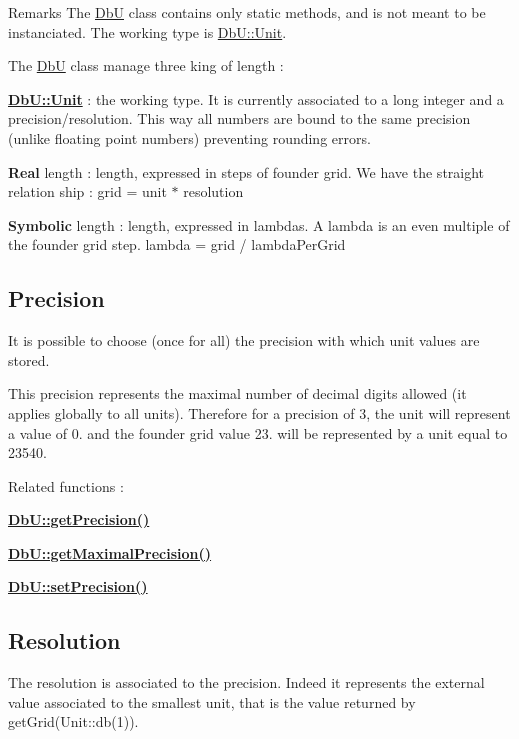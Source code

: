 \begin{DoxyRemark}{Remarks}
The \mbox{\hyperlink{classHurricane_1_1DbU}{DbU}} class contains only static methods, and is not meant to be instanciated. The working type is \mbox{\hyperlink{group__DbUGroup_ga4fbfa3e8c89347af76c9628ea06c4146}{Db\+U\+::\+Unit}}.
\end{DoxyRemark}
The \mbox{\hyperlink{classHurricane_1_1DbU}{DbU}} class manage three king of length \+: 
\begin{DoxyItemize}
\item {\bfseries \mbox{\hyperlink{group__DbUGroup_ga4fbfa3e8c89347af76c9628ea06c4146}{Db\+U\+::\+Unit}}} \+: the working type. It is currently associated to a long integer and a precision/resolution. This way all numbers are bound to the same precision (unlike floating point numbers) preventing rounding errors. 
\item {\bfseries Real} length \+: length, expressed in steps of founder grid. We have the straight relation ship \+: grid = unit $\ast$ resolution 
\item {\bfseries Symbolic} length \+: length, expressed in lambdas. A lambda is an even multiple of the founder grid step. lambda = grid / lambda\+Per\+Grid 
\end{DoxyItemize}\hypertarget{group__DbUGroup_secDbUPrecision}{}\subsection{Precision}\label{group__DbUGroup_secDbUPrecision}
It is possible to choose (once for all) the precision with which unit values are stored.

This precision represents the maximal number of decimal digits allowed (it applies globally to all units). Therefore for a precision of 3, the unit will represent a value of 0. and the founder grid value 23. will be represented by a unit equal to 23540.

Related functions \+: 
\begin{DoxyItemize}
\item {\bfseries \mbox{\hyperlink{group__DbUGroup_ga6169efbdd9b3d54a0bd8467c8f957fda}{Db\+U\+::get\+Precision()}}} 
\item {\bfseries \mbox{\hyperlink{group__DbUGroup_ga8756c9f0a32af5f601cd150e73b02c03}{Db\+U\+::get\+Maximal\+Precision()}}} 
\item {\bfseries \mbox{\hyperlink{group__DbUGroup_gace9a8644e7e80dcaed2a8a95deeb1622}{Db\+U\+::set\+Precision()}}} 
\end{DoxyItemize}\hypertarget{group__DbUGroup_secDbUResolution}{}\subsection{Resolution}\label{group__DbUGroup_secDbUResolution}
The resolution is associated to the precision. Indeed it represents the external value associated to the smallest unit, that is the value returned by get\+Grid(\+Unit\+::db(1)).


